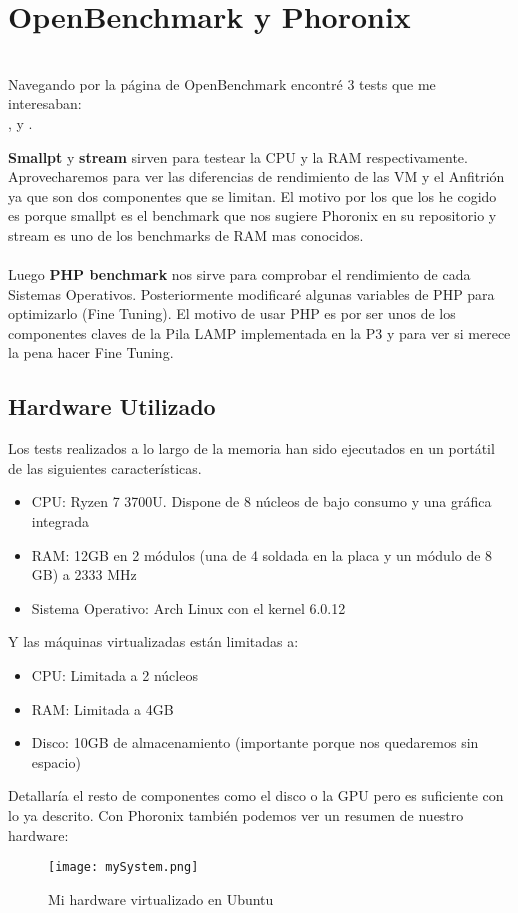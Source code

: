 \section{OpenBenchmark y Phoronix}
\quad\\
Navegando por la página de OpenBenchmark \cite{openbenchmark} encontré 3 tests que me interesaban:\\ ,  y .

\textbf{Smallpt} y \textbf{stream} sirven para testear la CPU y la RAM respectivamente. Aprovecharemos para ver las diferencias de rendimiento de las VM y el Anfitrión ya que son dos componentes que se limitan.  El motivo por los que los he cogido es porque smallpt es el benchmark que nos sugiere Phoronix en su repositorio y stream es uno de los benchmarks de RAM mas conocidos.
\\\\
Luego \textbf{PHP benchmark} nos sirve para comprobar el rendimiento de cada Sistemas Operativos. Posteriormente modificaré algunas variables de PHP para optimizarlo (Fine Tuning). El motivo de usar PHP es por ser unos de los componentes claves de la Pila LAMP implementada en la P3 y para ver si merece la pena hacer Fine Tuning.
\subsection{Hardware Utilizado}
Los tests realizados a lo largo de la memoria han sido ejecutados en un portátil de las siguientes características.
\begin{itemize}
	\item CPU: Ryzen 7 3700U. Dispone de 8 núcleos de bajo consumo y una gráfica integrada
	\item RAM: 12GB en 2 módulos (una de 4 soldada en la placa y un módulo de 8 GB) a 2333 MHz
	\item Sistema Operativo: Arch Linux con el kernel 6.0.12
\end{itemize}
Y las máquinas virtualizadas están limitadas a:
\begin{itemize}
	\item CPU: Limitada a 2 núcleos
	\item RAM: Limitada a 4GB
	\item Disco: 10GB de almacenamiento (importante porque nos quedaremos sin espacio)
\end{itemize}
Detallaría el resto de componentes como el disco o la GPU pero es suficiente con lo ya descrito. Con Phoronix también podemos ver un resumen de nuestro hardware:
\begin{figure}[H]
	\centering
	\texttt{[image: mySystem.png]}
	\caption{Mi hardware virtualizado en Ubuntu}
\end{figure}

